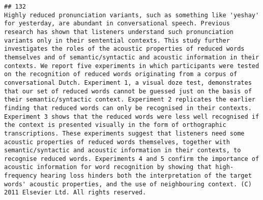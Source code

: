 \documentclass[
  english,
  man]{apa6}
\begin{document}
\begin{verbatim}
## 132                                                                                                                                                                                                                                                                                                                                                                                                                                                                                                                                                                                                                                                                                                                                                                                                                                                                                                                                                                                                                                                                                                                                                             Highly reduced pronunciation variants, such as something like 'yeshay' for yesterday, are abundant in conversational speech. Previous research has shown that listeners understand such pronunciation variants only in their sentential contexts. This study further investigates the roles of the acoustic properties of reduced words themselves and of semantic/syntactic and acoustic information in their contexts. We report five experiments in which participants were tested on the recognition of reduced words originating from a corpus of conversational Dutch. Experiment 1, a visual doze test, demonstrates that our set of reduced words cannot be guessed just on the basis of their semantic/syntactic context. Experiment 2 replicates the earlier finding that reduced words can only be recognised in their contexts. Experiment 3 shows that the reduced words were less well recognised if the context is presented visually in the form of orthographic transcriptions. These experiments suggest that listeners need some acoustic properties of reduced words themselves, together with semantic/syntactic and acoustic information in their contexts, to recognise reduced words. Experiments 4 and 5 confirm the importance of acoustic information for word recognition by showing that high-frequency hearing loss hinders both the interpretation of the target words' acoustic properties, and the use of neighbouring context. (C) 2011 Elsevier Ltd. All rights reserved.

\end{verbatim}
\end{document}
